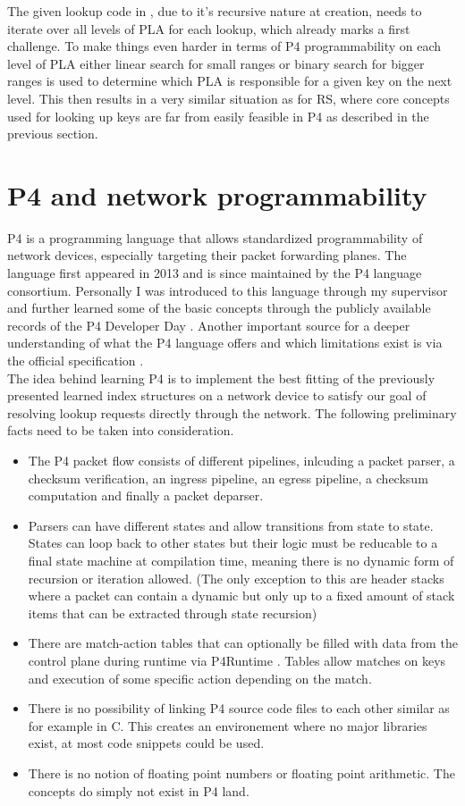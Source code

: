 The given lookup code in \cite{pgm}, due to it's recursive nature at creation, needs to iterate over all levels of PLA for each lookup, which already marks a first challenge. To make things even harder in terms of P4 programmability on each level of PLA either linear search for small ranges or binary search for bigger ranges is used to determine which PLA is responsible for a given key on the next level. This then results in a very similar situation as for RS, where core concepts used for looking up keys are far from easily feasible in P4 as described in the previous section.

\section{P4 and network programmability}
P4 is a programming language that allows standardized programmability of network devices, especially targeting their packet forwarding planes. The language first appeared in 2013 and is since maintained by the P4 language consortium. Personally I was introduced to this language through my supervisor and further learned some of the basic concepts through the publicly available records of the P4 Developer Day \cite{p4-devday}. Another important source for a deeper understanding of what the P4 language offers and which limitations exist is via the official specification \cite{p4-spec}.\\
The idea behind learning P4 is to implement the best fitting of the previously presented learned index structures on a network device to satisfy our goal of resolving lookup requests directly through the network. The following preliminary facts need to be taken into consideration.

\begin{itemize}
  \item The P4 packet flow consists of different pipelines, inlcuding a packet parser, a checksum verification, an ingress pipeline, an egress pipeline, a checksum computation and finally a packet deparser.
  \item Parsers can have different states and allow transitions from state to state. States can loop back to other states but their logic must be reducable to a final state machine at compilation time, meaning there is no dynamic form of recursion or iteration allowed. (The only exception to this are header stacks where a packet can contain a dynamic but only up to a fixed amount of stack items that can be extracted through state recursion)
  \item There are match-action tables that can optionally be filled with data from the control plane during runtime via P4Runtime \cite{p4runtime-spec}. Tables allow matches on keys and execution of some specific action depending on the match.
  \item There is no possibility of linking P4 source code files to each other similar as for example in C. This creates an environement where no major libraries exist, at most code snippets could be used.
  \item There is no notion of floating point numbers or floating point arithmetic. The concepts do simply not exist in P4 land.
\end{itemize}

